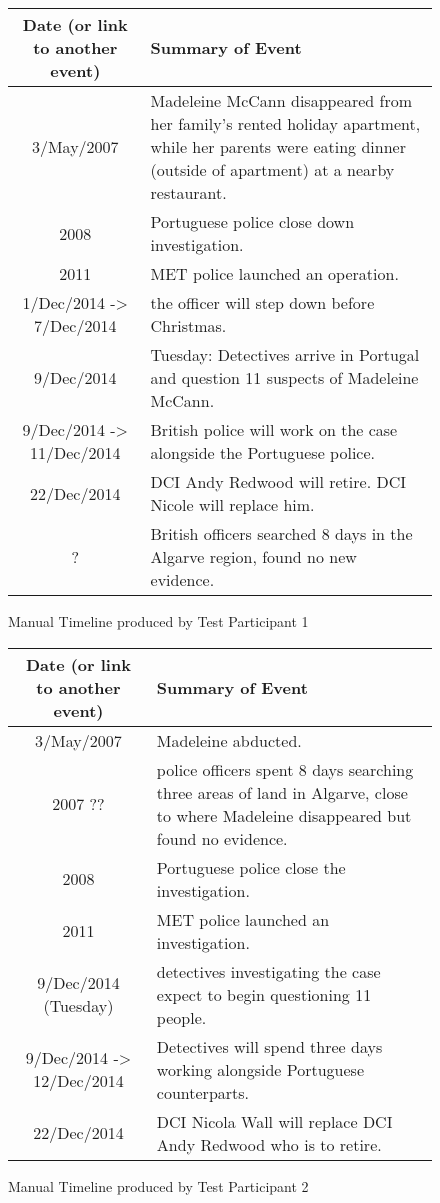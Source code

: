 \begin{figure}[H]
\begin{tabular}{|c|p{7cm}|}
\hline
Date (or link to another event) & Summary of Event\\
\hline
\hline
3/May/2007 &Madeleine McCann disappeared from her family's rented holiday apartment, while her parents were eating dinner (outside of apartment) at a nearby restaurant.\\
\hline
2008 & Portuguese police close down investigation.\\
\hline
2011 & MET police launched an operation.\\
\hline
1/Dec/2014 -> 7/Dec/2014 & the officer will step down before Christmas.\\
\hline
9/Dec/2014 & Tuesday: Detectives arrive in Portugal and question 11 suspects of Madeleine McCann.\\
\hline
9/Dec/2014 -> 11/Dec/2014 & British police will work on the case alongside the Portuguese police.\\
\hline
22/Dec/2014 & DCI Andy Redwood will retire. DCI Nicole will replace him.\\
\hline
? & British officers searched 8 days in the Algarve region, found no new evidence.\\
\hline
\end{tabular}
\caption{Manual Timeline produced by Test Participant 1}
\end{figure}

\begin{figure}[H]
\begin{tabular}{|c|p{7cm}|}
\hline
Date (or link to another event) & Summary of Event\\
\hline
\hline
3/May/2007 & Madeleine abducted.\\
\hline
2007 ?? &  police officers spent 8 days searching three areas of land in Algarve, close to where Madeleine disappeared but found no evidence.\\
\hline
2008 & Portuguese police close the investigation.\\
\hline
2011 & MET police launched an investigation.\\
\hline
9/Dec/2014 (Tuesday) & detectives investigating the case expect to begin questioning 11 people.\\
\hline
9/Dec/2014 -> 12/Dec/2014 & Detectives will spend three days working alongside Portuguese counterparts.\\
\hline
22/Dec/2014 & DCI Nicola Wall will replace DCI Andy Redwood who is to retire.\\
\hline
\end{tabular}
\caption{Manual Timeline produced by Test Participant 2}
\end{figure}

